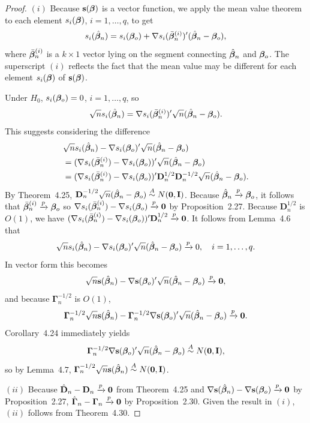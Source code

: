 \begin{proof}
$(i)$ Because $\mathbf{s}(\boldsymbol{\beta})$ is a vector function, we apply the mean value
theorem to each element $s_i(\boldsymbol{\beta})$, $i = 1, \ldots, q$, to get
\[
s_i(\hat{\boldsymbol{\beta}}_n) = s_i(\boldsymbol{\beta}_o) + \nabla s_i(\bar{\boldsymbol{\beta}}_n^{(i)})'(\hat{\boldsymbol{\beta}}_n - \boldsymbol{\beta}_o),
\]
where $\bar{\boldsymbol{\beta}}_n^{(i)}$ is a $k \times 1$ vector lying on the segment connecting $\hat{\boldsymbol{\beta}}_n$ and $\boldsymbol{\beta}_o$.
The superscript $(i)$ reflects the fact that the mean value may be different
for each element $s_i(\boldsymbol{\beta})$ of $\mathbf{s}(\boldsymbol{\beta})$.

Under $H_0$, $s_i(\boldsymbol{\beta}_o) = 0$, $i = 1, \ldots, q$, so
\[
\sqrt{n}s_i(\hat{\boldsymbol{\beta}}_n) = \nabla s_i(\bar{\boldsymbol{\beta}}_n^{(i)})'\sqrt{n}(\hat{\boldsymbol{\beta}}_n - \boldsymbol{\beta}_o).
\]
This suggests considering the difference
\begin{align*}
&\sqrt{n}s_i(\hat{\boldsymbol{\beta}}_n) - \nabla s_i(\boldsymbol{\beta}_o)'\sqrt{n}(\hat{\boldsymbol{\beta}}_n - \boldsymbol{\beta}_o) \\
&= (\nabla s_i(\bar{\boldsymbol{\beta}}_n^{(i)}) - \nabla s_i(\boldsymbol{\beta}_o))'\sqrt{n}(\hat{\boldsymbol{\beta}}_n - \boldsymbol{\beta}_o) \\
&= (\nabla s_i(\bar{\boldsymbol{\beta}}_n^{(i)}) - \nabla s_i(\boldsymbol{\beta}_o))'\mathbf{D}_n^{1/2}\mathbf{D}_n^{-1/2}\sqrt{n}(\hat{\boldsymbol{\beta}}_n - \boldsymbol{\beta}_o).
\end{align*}
By Theorem~4.25, $\mathbf{D}_n^{-1/2}\sqrt{n}(\hat{\boldsymbol{\beta}}_n - \boldsymbol{\beta}_o) \overset{A}{\sim} N(\mathbf{0}, \mathbf{I})$. Because $\hat{\boldsymbol{\beta}}_n \xrightarrow{p} \boldsymbol{\beta}_o$, it
follows that $\bar{\boldsymbol{\beta}}_n^{(i)} \xrightarrow{p} \boldsymbol{\beta}_o$ so $\nabla s_i(\bar{\boldsymbol{\beta}}_n^{(i)}) - \nabla s_i(\boldsymbol{\beta}_o) \xrightarrow{p} \mathbf{0}$ by Proposition~2.27.
Because $\mathbf{D}_n^{1/2}$ is $O(1)$, we have $(\nabla s_i(\bar{\boldsymbol{\beta}}_n^{(i)}) - \nabla s_i(\boldsymbol{\beta}_o))'\mathbf{D}_n^{1/2} \xrightarrow{p} \mathbf{0}$. It follows
from Lemma~4.6 that
\[
\sqrt{n}s_i(\hat{\boldsymbol{\beta}}_n) - \nabla s_i(\boldsymbol{\beta}_o)'\sqrt{n}(\hat{\boldsymbol{\beta}}_n - \boldsymbol{\beta}_o) \xrightarrow{p} 0, \quad i = 1, \ldots, q.
\]
In vector form this becomes
\[
\sqrt{n}\mathbf{s}(\hat{\boldsymbol{\beta}}_n) - \nabla \mathbf{s}(\boldsymbol{\beta}_o)'\sqrt{n}(\hat{\boldsymbol{\beta}}_n - \boldsymbol{\beta}_o) \xrightarrow{p} \mathbf{0},
\]
and because $\boldsymbol{\Gamma}_n^{-1/2}$ is $O(1)$,
\[
\boldsymbol{\Gamma}_n^{-1/2}\sqrt{n}\mathbf{s}(\hat{\boldsymbol{\beta}}_n) - \boldsymbol{\Gamma}_n^{-1/2}\nabla \mathbf{s}(\boldsymbol{\beta}_o)'\sqrt{n}(\hat{\boldsymbol{\beta}}_n - \boldsymbol{\beta}_o) \xrightarrow{p} \mathbf{0}.
\]
Corollary~4.24 immediately yields
\[
\boldsymbol{\Gamma}_n^{-1/2}\nabla \mathbf{s}(\boldsymbol{\beta}_o)'\sqrt{n}(\hat{\boldsymbol{\beta}}_n - \boldsymbol{\beta}_o) \overset{A}{\sim} N(\mathbf{0}, \mathbf{I}),
\]
so by Lemma~4.7, $\boldsymbol{\Gamma}_n^{-1/2}\sqrt{n}\mathbf{s}(\hat{\boldsymbol{\beta}}_n) \overset{A}{\sim} N(\mathbf{0}, \mathbf{I})$.

$(ii)$ Because $\hat{\mathbf{D}}_n - \mathbf{D}_n \xrightarrow{p} \mathbf{0}$ from Theorem~4.25 and $\nabla \mathbf{s}(\hat{\boldsymbol{\beta}}_n) - \nabla \mathbf{s}(\boldsymbol{\beta}_o) \xrightarrow{p}
\mathbf{0}$ by Proposition~2.27, $\hat{\boldsymbol{\Gamma}}_n - \boldsymbol{\Gamma}_n \xrightarrow{p} \mathbf{0}$ by Proposition~2.30. Given the result
in $(i)$, $(ii)$ follows from Theorem~4.30.
\end{proof}

